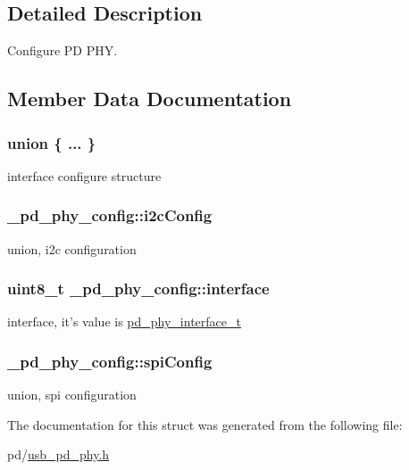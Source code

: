 \subsection{Detailed Description}
Configure P\-D P\-H\-Y. 

\subsection{Member Data Documentation}
\hypertarget{struct__pd__phy__config_a1fdfe3a88c0a335fb0b15063fc067d97}{\subsubsection[{"@59}]{\setlength{\rightskip}{0pt plus 5cm}union \{ ... \} }}\label{struct__pd__phy__config_a1fdfe3a88c0a335fb0b15063fc067d97}
interface configure structure \hypertarget{struct__pd__phy__config_aa606732850969dd6c9bd06b608e8015c}{
\subsubsection[{i2c\-Config}]{ \-\_\-pd\-\_\-phy\-\_\-config\-::i2c\-Config}}\label{struct__pd__phy__config_aa606732850969dd6c9bd06b608e8015c}
union, i2c configuration \hypertarget{struct__pd__phy__config_aa5aa79cabb041cefecc0483c840f75a1}{
\subsubsection[{interface}]{\setlength{\rightskip}{0pt plus 5cm}uint8\-\_\-t \-\_\-pd\-\_\-phy\-\_\-config\-::interface}}\label{struct__pd__phy__config_aa5aa79cabb041cefecc0483c840f75a1}
interface, it's value is \hyperlink{group__usb__pd__stack_ga0499cb1eb2ad70e8d155ff72b50c7a38}{pd\-\_\-phy\-\_\-interface\-\_\-t} \hypertarget{struct__pd__phy__config_a5e3478079386b40d5b795897396853cb}{
\subsubsection[{spi\-Config}]{ \-\_\-pd\-\_\-phy\-\_\-config\-::spi\-Config}}\label{struct__pd__phy__config_a5e3478079386b40d5b795897396853cb}
union, spi configuration 

The documentation for this struct was generated from the following file\-:\begin{DoxyCompactItemize}
\item 
pd/\hyperlink{usb__pd__phy_8h}{usb\-\_\-pd\-\_\-phy.\-h}\end{DoxyCompactItemize}
